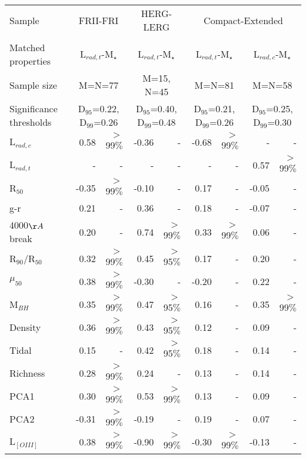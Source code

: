 \documentclass[usenatbib]{mn2e}
\begin{document}
\begin{table*}
\begin{tabular}{l*{8}{r}}  %
\hline
\multicolumn{1}{l}{ Sample} & \multicolumn{2}{c}{FRII-FRI} & \multicolumn{2}{c}{HERG-LERG}  & \multicolumn{4}{c}{Compact-Extended}\\ 
\multicolumn{1}{c}{ } & \multicolumn{2}{c}{} & \multicolumn{2}{c}{}  & \multicolumn{4}{c}{}\\ 
\multicolumn{1}{l}{Matched properties}  & \multicolumn{2}{c}{L$_{rad,t}$-M$_{\star}$} & \multicolumn{2}{c}{L$_{rad,t}$-M$_{\star}$} & \multicolumn{2}{c}{L$_{rad,t}$-M$_{\star}$} & \multicolumn{2}{c}{L$_{rad,c}$-M$_{\star}$}\\
\multicolumn{1}{l}{Sample size}  & \multicolumn{2}{c}{M=N=77} & \multicolumn{2}{c}{M=15, N=45} & \multicolumn{2}{c}{M=N=81} & \multicolumn{2}{c}{M=N=58}\\
\multicolumn{1}{l}{Significance thresholds}  & \multicolumn{2}{c}{D$_{95}$=0.22, D$_{99}$=0.26} & \multicolumn{2}{c}{D$_{95}$=0.40, D$_{99}$=0.48} & \multicolumn{2}{c}{D$_{95}$=0.21, D$_{99}$=0.26} & \multicolumn{2}{c}{D$_{95}$=0.25, D$_{99}$=0.30}\\
\hline 
L$_{rad,c}$   & 0.58 & $>$99$\%$ & -0.36 & - & -0.68 & $>$99$\%$&- & -\\
L$_{rad,t}$  & - & - & - & - & - & -&0.57 & $>$99$\%$ \\
R$_{50}$ & -0.35 & $>$99$\%$ & -0.10 & - & 0.17 & -&-0.05 & - \\
 g-r& 0.21 & - & 0.36 & - & 0.18 & -&-0.07 & - \\
4000$\AA$ break & 0.20 & - & 0.74 & $>$99$\%$ & 0.33 & $>$99$\%$&0.06 & - \\
 R$_{90}$/R$_{50}$& 0.32 & $>$99$\%$ & 0.45 & $>$95$\%$ & 0.17 & -&0.20 & - \\
$\mu_{50}$ & 0.38 & $>$99$\%$ & -0.30 & - & -0.20 & -&0.22 & - \\
M$_{BH}$ & 0.35 & $>$99$\%$ & 0.47 & $>$95$\%$ & 0.16 & -&0.35 & $>$99$\%$ \\
Density  & 0.36 & $>$99$\%$ & 0.43 & $>$95$\%$ & 0.12 & -&0.09 & -\\
Tidal  & 0.15 & - & 0.42 & $>$95$\%$ & 0.18 & -&0.14 & -\\
Richness  & 0.28 & $>$99$\%$ & 0.24 & - & 0.13 & -&0.14 & -\\
PCA1  & 0.30 & $>$99$\%$ & 0.53 & $>$99$\%$ & 0.13 & -&0.09 & -\\
PCA2 & -0.31 & $>$99$\%$ & -0.19 & - & 0.19 & -&0.07 & - \\
 L$_{[OIII]}$& 0.38 & $>$99$\%$ & -0.90 & $>$99$\%$& -0.30 & $>$99$\%$ &-0.13 & -  \\




\end{tabular}
\end{table*}
\end{document}
